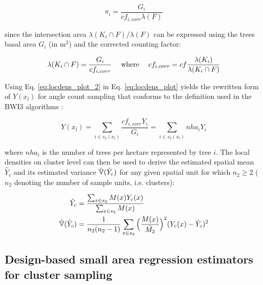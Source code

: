\begin{equation}\label{eq:locdens_plot_2}
\pi_{i} = \frac{G_i}{cf_{i,corr}\lambda(F)}
	\end{equation}

since the intersection area $\lambda(K_i \cap F)/\lambda(F)$ can be expressed using the trees basal area $G_i$ (in m$^2$) and the corrected counting factor:

\begin{equation}\label{eq:locdens_plot_3}
\lambda(K_i \cap F) = \frac{G_i}{cf_{i, corr}} \hspace{3ex} \text{where} \hspace{3ex} cf_{i,corr} = cf\frac{\lambda(K_i)}{\lambda(K_i \cap F)}
\end{equation}

Using Eq. \ref{eq:locdens_plot_2} in Eq. \ref{eq:locdens_plot} yields the rewritten form of $Y(x_l)$ for angle count sampling that conforms to the definition used in the BWI3 algorithms \citep{bwi3_ausw}:

\begin{equation}\label{eq:locdens_plot_4}
Y(x_l)= \sum_{i \in s_{2}(x_l)} \frac{cf_{i, corr}Y_i}{G_i} = \sum_{i \in s_{2}(x_l)} nha_{i}{Y_i}
\end{equation}

where $nha_i$ is the number of trees per hectare represented by tree $i$. The local densities on cluster level can then be used to derive the estimated spatial mean $\hat{Y}_c$ and its estimated variance $\hat{\mathbb{V}}(\hat{Y}_c)$ for any given spatial unit for which $n_2 \geq 2$ ($n_2$ denoting the number of sample units, i.e. clusters):

\begin{subequations}\label{eq:srs_est_cluster}
	\begin{align}
\hat{Y}_c &= \frac{\sum_{x \in s_2} M(x) Y_{c}(x)}{\sum_{x \in s_2} M(x)} \\
\hat{\mathbb{V}}(\hat{Y}_c) &= \frac{1}{n_2(n_2 - 1)}\sum_{x \in s_2}\Big(\frac{M(x)}{\bar{M_2}}\Big)^2(Y_{c}(x) - \hat{Y}_c)^2
	\end{align}
\end{subequations}


\subsection{Design-based small area regression estimators for cluster sampling}
\label{sec:SAestimators}


